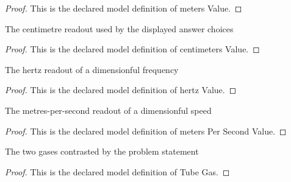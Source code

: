 \begin{proof}
  This is the declared model definition of meters Value.
\end{proof}
\begin{definition}
  \label{def:physics:phyx-mini-0118:phyxminiproblems-problemphyxmini0118-centimetersvalue}
  The centimetre readout used by the displayed answer choices
\end{definition}
\begin{proof}
  This is the declared model definition of centimeters Value.
\end{proof}
\begin{definition}
  \label{def:physics:phyx-mini-0118:phyxminiproblems-problemphyxmini0118-hertzvalue}
  The hertz readout of a dimensionful frequency
\end{definition}
\begin{proof}
  This is the declared model definition of hertz Value.
\end{proof}
\begin{definition}
  \label{def:physics:phyx-mini-0118:phyxminiproblems-problemphyxmini0118-meterspersecondvalue}
  The metres-per-second readout of a dimensionful speed
\end{definition}
\begin{proof}
  This is the declared model definition of meters Per Second Value.
\end{proof}
\begin{definition}
  \label{def:physics:phyx-mini-0118:phyxminiproblems-problemphyxmini0118-tubegas}
  The two gases contrasted by the problem statement
\end{definition}
\begin{proof}
  This is the declared model definition of Tube Gas.
\end{proof}
